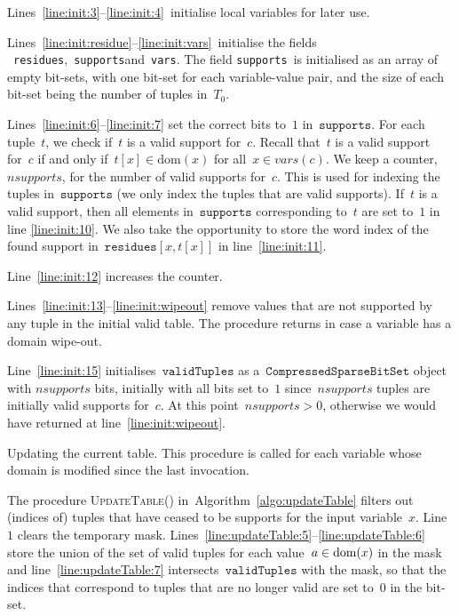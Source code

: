 \documentclass[a4paper,11pt]{article}
\newcommand{\Algoref}[1]{Algorithm~\ref{#1}}
\newcommand{\Lineref}[1]{Line~\ref{#1}}
\newcommand{\Linesref}[2]{Lines~\ref{#1}--\ref{#2}}
\newcommand{\lineref}[1]{line~\ref{#1}}
\newcommand{\Dom}[1]{\text{dom}({#1})}
\newcommand{\SparseBitSet}{\texttt{CompressedSparseBitSet}}
\newcommand{\CurrTable}{\texttt{validTuples}}
\newcommand{\Supports}{\texttt{supports}}
\newcommand{\Residues}{\texttt{residues}}
\newcommand{\Vars}{\texttt{vars}}
\def\UpdateTable{\textsc{UpdateTable}}
\newcommand{\localvar}[1]{\mathit{#1}}
\numberwithin{equation}{section}
\begin{document}
\Linesref{line:init:3}{line:init:4}~initialise local variables for later use.

\Linesref{line:init:residue}{line:init:vars}~initialise the fields
~\Residues,~\Supports and~\Vars.
The field \Supports~is initialised as an array of empty bit-sets,
with one bit-set for each
variable-value pair, and the size of each
bit-set being the number of tuples in~$T_0$.

\Linesref{line:init:6}{line:init:7} set the correct bits to~$1$ in~$\Supports$.
For each tuple~$t$, we check if~$t$ is a valid support for~$c$. Recall that~$t$ is
a valid support for~$c$ if and only if~$t[x] \in \Dom{x}$ for all~$x \in \mathit{vars}(c)$.
We keep a counter,~$\mathit{nsupports}$, for the number of valid supports for~$c$.
This is used for indexing the tuples in~$\Supports$ (we only index the tuples
that are valid supports).
If~$t$ is a valid support, then
all elements in~$\Supports$ corresponding to~$t$ are set to~$1$ in
line \ref{line:init:10}. We also take the opportunity to store the word index
of the found support in~$\Residues[x,t[x]]$
in line~\ref{line:init:11}. 

Line~\ref{line:init:12} increases the counter.

\Linesref{line:init:13}{line:init:wipeout} remove values that are not supported
by any tuple in the initial valid table. The procedure returns in case a variable
has a domain wipe-out.

\Lineref{line:init:15} initialises~$\CurrTable$ as a~$\SparseBitSet$ object with
$\mathit{nsupports}$ bits, initially with all bits set to~$1$ since~$\mathit{nsupports}$
tuples are initially valid supports for~$c$.
At this point~$\localvar{nsupports} > 0$,
otherwise we would have returned at line~\ref{line:init:wipeout}.

  \begin{algorithm}[t]
  \begin{algorithmic}[1]  %
    
  \end{algorithmic}
  \caption{Updating the current table. This procedure is called for 
    each variable whose domain is modified since the last invocation.}
  \label{algo:updateTable}
\end{algorithm}

\bigskip

  The procedure \UpdateTable() in~\Algoref{algo:updateTable}
  filters out (indices of)
  tuples that have ceased to be supports for the input variable~$x$.
  Line~$1$ clears the temporary mask.
  \Linesref{line:updateTable:5}{line:updateTable:6} store the union of the
  set of valid tuples for each value~$a \in \text{dom}(x)$ in the mask
  and \lineref{line:updateTable:7} intersects~$\CurrTable$ with the mask,
  so that the indices that correspond to tuples that are no longer valid
  are set to~$0$ in the bit-set.
\end{document}
